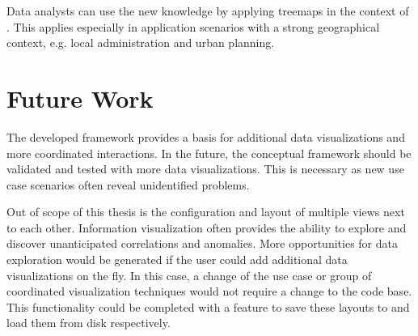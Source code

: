 Data analysts can use the new knowledge by applying treemaps in the context of \dss{}.
This applies especially in application scenarios with a strong geographical context, e.g. local administration and urban planning.


\section{Future Work}

The developed \cmv{} framework provides a basis for additional data visualizations and more coordinated interactions.
In the future, the conceptual framework should be validated and tested with more data visualizations.
This is necessary as new use case scenarios often reveal unidentified problems.

Out of scope of this thesis is the configuration and layout of multiple views next to each other.
Information visualization often provides the ability to explore and discover unanticipated correlations and anomalies.
More opportunities for data exploration would be generated if the user could add additional data visualizations on the fly.
In this case, a change of the use case or group of coordinated visualization techniques would not require a change to the code base.
This functionality could be completed with a feature to save these layouts to and load them from disk respectively.

